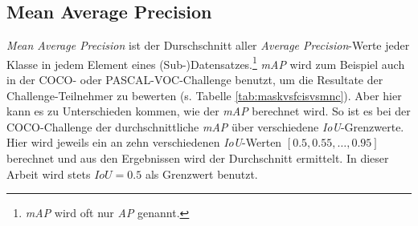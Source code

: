 \subsection{Mean Average Precision}

\textit{Mean Average Precision} ist der Durschschnitt aller \textit{Average Precision}-Werte jeder Klasse in jedem Element eines (Sub-)Datensatzes.\footnote{\textit{mAP} wird oft nur \textit{AP} genannt.} \textit{mAP} wird zum Beispiel auch in der COCO- oder PASCAL-VOC-Challenge benutzt, um die Resultate der Challenge-Teilnehmer zu bewerten (s. Tabelle \ref{tab:maskvsfcisvsmnc}). Aber hier kann es zu Unterschieden kommen, wie der \textit{mAP} berechnet wird. So ist es bei der COCO-Challenge der durchschnittliche \textit{mAP} über verschiedene \textit{IoU}-Grenzwerte. Hier wird jeweils ein  an zehn verschiedenen \textit{IoU}-Werten $[0.5, 0.55, \dots, 0.95]$ berechnet und aus den Ergebnissen wird der Durchschnitt ermittelt.\cite{ref:coco:eval} In dieser Arbeit wird stets $IoU=0.5$ als Grenzwert benutzt.